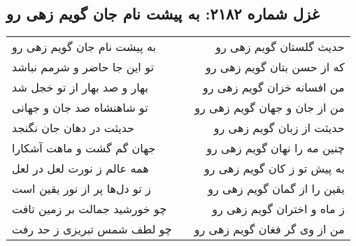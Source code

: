 \begin{center}
\section*{غزل شماره ۲۱۸۲: به پیشت نام جان گویم زهی رو}
\label{sec:2182}
\begin{longtable}{l p{0.5cm} r}
به پیشت نام جان گویم زهی رو
&&
حدیث گلستان گویم زهی رو
\\
تو این جا حاضر و شرمم نباشد
&&
که از حسن بتان گویم زهی رو
\\
بهار و صد بهار از تو خجل شد
&&
من افسانه خزان گویم زهی رو
\\
تو شاهنشاه صد جان و جهانی
&&
من از جان و جهان گویم زهی رو
\\
حدیثت در دهان جان نگنجد
&&
حدیثت از زبان گویم زهی رو
\\
جهان گم گشت و ماهت آشکارا
&&
چنین مه را نهان گویم زهی رو
\\
همه عالم ز نورت لعل در لعل
&&
به پیش تو ز کان گویم زهی رو
\\
ز تو دل‌ها پر از نور یقین است
&&
یقین را از گمان گویم زهی رو
\\
چو خورشید جمالت بر زمین تافت
&&
ز ماه و اختران گویم زهی رو
\\
چو لطف شمس تبریزی ز حد رفت
&&
من از وی گر فغان گویم زهی رو
\\
\end{longtable}
\end{center}
